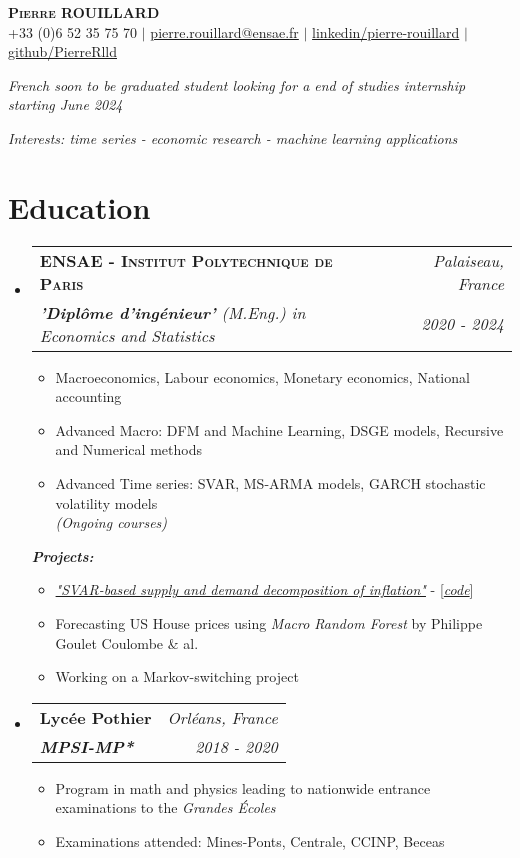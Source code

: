 \documentclass[letterpaper,10pt]{article}
\makeatletter
\newcommand{\resumeItem}[1]{
    \item\small{
            {#1 \vspace{-2pt}}
    }
}
\newcommand{\resumeSubheading}[4]{
    \vspace{-2pt}\item
    \begin{tabular*}{0.97\textwidth}[t]{l@{\extracolsep{\fill}}r}
        \textbf{#1}       & #2                 \\
        \textit{\small#3} & \textit{\small #4} \\
    \end{tabular*}\vspace{-7pt}
}
\newcommand{\resumeSubHeadingListStart}{\begin{itemize}[leftmargin=0.15in, label={}]}
\newcommand{\resumeSubHeadingListEnd}{\end{itemize}}
\newcommand{\resumeItemListStart}{\begin{itemize}}
\newcommand{\resumeItemListEnd}{\end{itemize}\vspace{-5pt}}
\makeatother
\begin{document}
\begin{center}
{\Large\textsc{\textbf{Pierre ROUILLARD}}} \\ \vspace{2pt}
\small +33 (0)6 52 35 75 70 $|$ \href{mailto:pierre.rouillard@ensae.fr}{pierre.rouillard@ensae.fr} $|$
\href{https://www.linkedin.com/in/pierre-rouillard/}{linkedin/pierre-rouillard} $|$
\href{https://github.com/PierreRlld}{github/PierreRlld}\\
\vspace{.1cm}
\end{center}

\begin{center}
    \textit{French soon to be graduated student looking for a end of studies internship starting June 2024}\par
    \textit{Interests: time series - economic research - machine learning applications}
\end{center}

\section{Education}
\resumeSubHeadingListStart
\resumeSubheading
{\textsc{ENSAE - Institut Polytechnique de Paris}}{\textit{\small{Palaiseau, France}}}{\textbf{'Diplôme d'ingénieur'} (M.Eng.) in Economics and Statistics}{2020 - 2024}
\resumeItemListStart
\resumeItem{Macroeconomics, Labour economics, Monetary economics, National accounting}
\resumeItem{Advanced Macro: DFM and Machine Learning, DSGE models, Recursive and Numerical methods}
\resumeItem{Advanced Time series: SVAR, MS-ARMA models, GARCH stochastic volatility models}\\
\vspace{.2cm}\textit{(Ongoing courses)}
\resumeItemListEnd
\quad \small{\textit{\textbf{Projects:}}}\vspace{-.2cm}
\resumeItemListStart
\resumeItem{\textcolor{blue(pigment)}{\textit{\href{https://github.com/PierreRlld/SVAR3A}{"SVAR-based supply and demand decomposition of inflation"}}} - [\textcolor{blue(pigment)}{\textit{\href{https://pierrerlld-svar3a-mainstreamlit-app-qy5le2.streamlit.app/}{code}}}]}
\resumeItem{Forecasting US House prices using \textit{Macro Random Forest} by Philippe Goulet Coulombe \& al.}
\resumeItem{Working on a Markov-switching project}
\resumeItemListEnd
\vspace{.1cm}
\resumeSubheading{Lycée Pothier}{\textit{\small{Orléans, France}}}
{\textbf{MPSI-MP*}}{2018 - 2020}
\resumeItemListStart
\resumeItem{Program in math and physics leading to nationwide entrance examinations to the \textit{Grandes Écoles}}
\resumeItem{Examinations attended: Mines-Ponts, Centrale, CCINP, Beceas}
\resumeItemListEnd
\resumeSubHeadingListEnd
\vspace{0cm}
\end{document}
